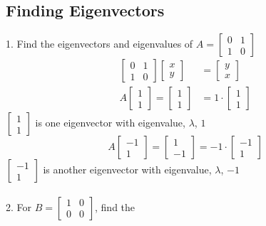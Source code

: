 \begin{enumerate}
\subsection{Finding Eigenvectors}
1. Find the eigenvectors and eigenvalues of $A = \begin{bmatrix} 
0 & 1 \\ 1 & 0 \end{bmatrix}$ 
\[
  \begin{aligned}
  \begin{bmatrix} 0 & 1 \\ 1 & 0 \end{bmatrix} \begin{bmatrix} x \\ y 
  \end{bmatrix} &= \begin{bmatrix} y \\ x \end{bmatrix} \\
  A \begin{bmatrix} 1 \\ 1 \end{bmatrix} = \begin{bmatrix} 1 \\ 1 
  \end{bmatrix} &= 1 \cdot \begin{bmatrix} 1 \\ 1 \end{bmatrix}
  \end{aligned}
\]
$\begin{bmatrix} 1 \\ 1 \end{bmatrix}$ is one eigenvector with 
eigenvalue, $\lambda$, $1$ 
\[
  A \begin{bmatrix} -1 \\ 1 \end{bmatrix} = \begin{bmatrix} 1 \\ -1 
  \end{bmatrix} = -1 \cdot \begin{bmatrix} -1 \\ 1 \end{bmatrix}
\]
$\begin{bmatrix} -1 \\ 1 \end{bmatrix}$ is another eigenvector with 
eigenvalue, $\lambda$, $-1$ \\\\
2. For $B = \begin{bmatrix} 1 & 0 \\ 0 & 0 \end{bmatrix}$, find the 

\end{enumerate}
